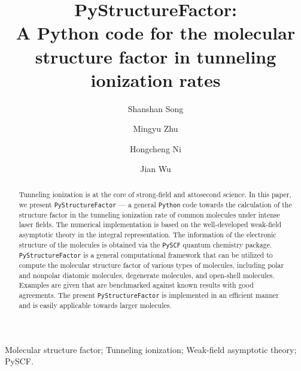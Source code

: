 \documentclass[preprint,12pt]{elsarticle} %
\begin{document}
\begin{frontmatter}

\title{PyStructureFactor:\texorpdfstring{\\}{ }A Python code for the molecular structure factor in tunneling ionization rates}

\author[a]{Shanshan Song}
\author[a,b]{Mingyu Zhu}
\author[a,c,d]{Hongcheng Ni}
\author[a,c,d,e]{Jian Wu}

\address[a]{State Key Laboratory of Precision Spectroscopy, East China Normal University, Shanghai 200241, China}
\address[b]{School of Physics and Electronic Science, East China Normal University, Shanghai 200241, China}
\address[c]{NYU-ECNU Joint Institute of Physics, New York University at Shanghai, Shanghai 200062, China}
\address[d]{Collaborative Innovation Center of Extreme Optics, Shanxi University, Taiyuan, Shanxi 030006, China}
\address[e]{CAS Center for Excellence in Ultra-intense Laser Science, Shanghai 201800, China}


\begin{abstract}
Tunneling ionization is at the core of strong-field and attosecond science. In this paper, we present \texttt{PyStructureFactor} --- a general \texttt{Python} code towards the calculation of the structure factor in the tunneling ionization rate of common molecules under intense laser fields. The numerical implementation is based on the well-developed weak-field asymptotic theory in the integral representation. The information of the electronic structure of the molecules is obtained via the \texttt{PySCF} quantum chemistry package. \texttt{PyStructureFactor} is a general computational framework that can be utilized to compute the molecular structure factor of various types of molecules, including polar and nonpolar diatomic molecules, degenerate molecules, and open-shell molecules. Examples are given that are benchmarked against known results with good agreements. The present \texttt{PyStructureFactor} is implemented in an efficient manner and is easily applicable towards larger molecules.
\end{abstract}

\begin{keyword}
Molecular structure factor; Tunneling ionization; Weak-field asymptotic theory; PySCF.
\end{keyword}

\end{frontmatter}
\end{document}
